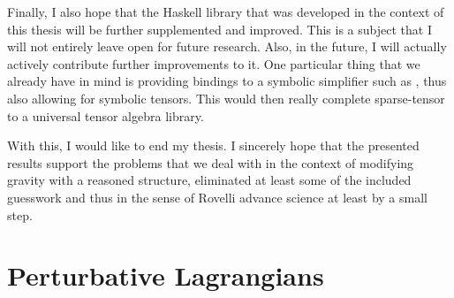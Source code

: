 \documentclass[a4paper,12pt, DIV=14, BCOR=5mm, twoside, headsepline, numbers=noenddot]{scrbook}
\begin{document}
Finally, I also hope that the Haskell library that was developed in the context of this thesis will be further supplemented and improved. This is a subject that I will not entirely leave open for future research. Also, in the future, I will actually actively contribute further improvements to it. One particular thing that we already have in mind is providing bindings to a symbolic simplifier such as \cite{SymPy}, thus also allowing for symbolic tensors. This would then really complete sparse-tensor to a universal tensor algebra library.

With this, I would like to end my thesis. I sincerely hope that the presented results support the problems that we deal with in the context of modifying gravity with a reasoned structure, eliminated at least some of the included guesswork and thus in the sense of Rovelli advance science at least by a small step.
\appendix

\chapter{Perturbative Lagrangians}
\end{document}
